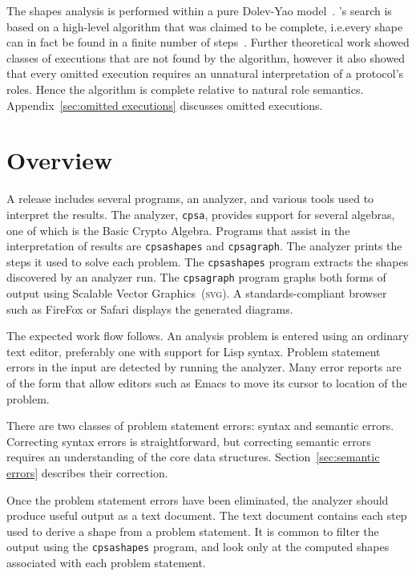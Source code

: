 \documentclass[12pt]{article}
\begin{document}
The shapes analysis is performed within a pure Dolev-Yao
model~\cite{DolevYao83}.  {\cpsa}'s search is based on a high-level
algorithm that was claimed to be complete, i.e.\@ every shape can in
fact be found in a finite number of
steps~\cite{DoghmiGuttmanThayer07,Guttman11}.  Further theoretical
work showed classes of executions that are not found by the algorithm,
however it also showed that every omitted execution requires an
unnatural interpretation of a protocol's roles.  Hence the algorithm
is complete relative to natural role semantics.
Appendix~\ref{sec:omitted executions} discusses omitted executions.

\section{Overview}

A {\cpsa} release includes several programs, an analyzer, and various
tools used to interpret the results.  The analyzer, \texttt{cpsa},
provides support for several algebras, one of which is the Basic
Crypto Algebra.  Programs that assist in the interpretation of results
are \texttt{cpsashapes} and \texttt{cpsagraph}.  The analyzer prints
the steps it used to solve each problem.  The \texttt{cpsashapes}
program extracts the shapes discovered by an analyzer run.  The
\texttt{cpsagraph} program graphs both forms of output using Scalable
Vector Graphics~(\textsc{svg}).  A standards-compliant browser such as
FireFox or Safari displays the generated diagrams.

The expected work flow follows.  An analysis problem is entered using
an ordinary text editor, preferably one with support for Lisp syntax.
Problem statement errors in the input are detected by running the
analyzer.  Many error reports are of the form that allow editors such
as Emacs to move its cursor to location of the problem.

There are two classes of problem statement errors: syntax and semantic
errors.  Correcting syntax errors is straightforward, but correcting
semantic errors requires an understanding of the core data structures.
Section~\ref{sec:semantic errors} describes their correction.

Once the problem statement errors have been eliminated, the analyzer
should produce useful output as a text document.  The text document
contains each step used to derive a shape from a problem statement.
It is common to filter the output using the \texttt{cpsashapes}
program, and look only at the computed shapes associated with each
problem statement.
\end{document}
